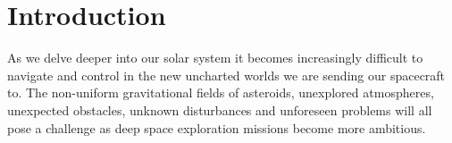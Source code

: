 \chapter{Introduction}

As we delve deeper into our solar system it becomes increasingly difficult to navigate and control in the new uncharted worlds we are sending our spacecraft to. The non-uniform gravitational fields of asteroids, unexplored atmospheres, unexpected obstacles, unknown disturbances and unforeseen problems will all pose a challenge as deep space exploration missions become more ambitious.

